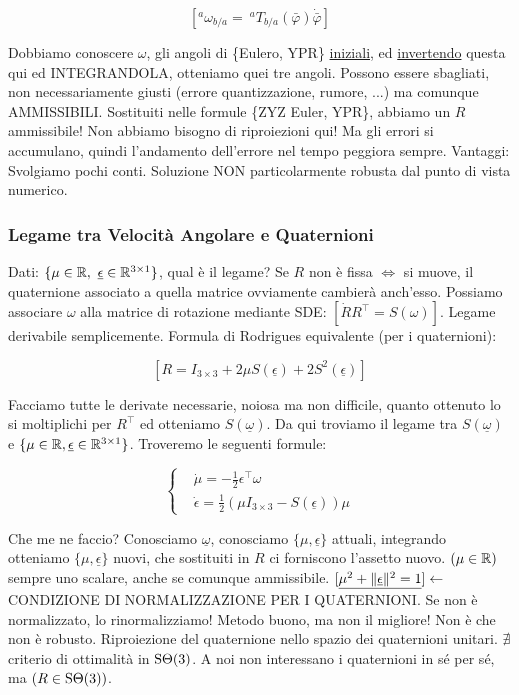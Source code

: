 \[	
	[^a\omega_{b/a} =\ ^aT_{b/a}(\bar{\varphi})\dot{\bar{\varphi}}]
\]

Dobbiamo conoscere $\omega$, gli angoli di \{Eulero, YPR\} \underline{iniziali}, ed \underline{invertendo} questa qui ed INTEGRANDOLA, otteniamo quei tre angoli. Possono essere sbagliati, non necessariamente giusti (errore quantizzazione, rumore, ...) ma comunque AMMISSIBILI. Sostituiti nelle formule \{ZYZ Euler, YPR\}, abbiamo un $R$ ammissibile! Non abbiamo bisogno di riproiezioni qui! Ma gli errori si accumulano, quindi l'andamento dell'errore nel tempo peggiora sempre. Vantaggi: Svolgiamo pochi conti. Soluzione NON particolarmente robusta dal punto di vista numerico.

\subsubsection{Legame tra Velocità Angolare e Quaternioni}

Dati: $\{\mu\in\R,\ \underline{\epsilon}\in\R^{3\times 1}\}$, qual è il legame? Se $R$ non è fissa $\iff$ si muove, il quaternione associato a quella matrice ovviamente cambierà anch'esso. Possiamo associare $\omega$ alla matrice di rotazione mediante SDE: $[\dot{R}R^\top = S(\omega)]$. Legame derivabile semplicemente. Formula di Rodrigues equivalente (per i quaternioni):

\[
	[R = I_{3\times 3} + 2\mu S(\underline{\epsilon}) + 2S^2(\underline{\epsilon})]
\]

Facciamo tutte le derivate necessarie, noiosa ma non difficile, quanto ottenuto lo si moltiplichi per $R^\top$ ed otteniamo $S(\underline{\omega})$. Da qui troviamo il legame tra $S(\underline{\omega})$ e $\{\mu\in\mathbb{R},\underline{\epsilon}\in\mathbb{R}^{3\times 1}\}$. Troveremo le seguenti formule:

\[
	\left\{
	\begin{aligned}
	&\dot{\mu} = -\frac{1}{2}\epsilon^\top\omega\\
	&\dot{\epsilon} = \frac{1}{2}(\mu I_{3\times 3}-S(\underline{\epsilon}))\mu
	\end{aligned}
	\right.
\]

Che me ne faccio? Conosciamo $\underline{\omega}$, conosciamo $\{\mu,\underline{\epsilon}\}$ attuali, integrando otteniamo $\{\mu,\underline{\epsilon}\}$ nuovi, che sostituiti in $R$ ci forniscono l'assetto nuovo. $(\mu\in\mathbb{R})$ sempre uno scalare, anche se comunque ammissibile. $[\underline{\mu^2+\lVert\underline{\epsilon}\rVert^2 = 1}] \leftarrow$ CONDIZIONE DI NORMALIZZAZIONE PER I QUATERNIONI. Se non è normalizzato, lo rinormalizziamo! Metodo buono, ma non il migliore! Non è che non è robusto. Riproiezione del quaternione nello spazio dei quaternioni unitari. $\nexists$ criterio di ottimalità in $\operatorname{S\Theta}(3)$. A noi non interessano i quaternioni in sé per sé, ma $(R\in\operatorname{S\Theta}(3))$. 


